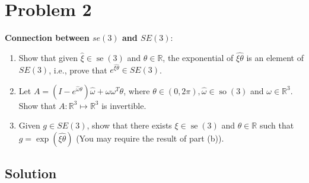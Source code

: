 \section*{Problem 2}

\textbf{Connection between \( s e(3) \) and \( S E(3) \)}:
\begin{enumerate}[label= (\alph*)]
    \item Show that given \( \hat{\xi} \in \operatorname{se}(3) \) and \( \theta \in \mathbb{R} \), the exponential of \( \hat{\xi \theta} \) is an element of \( S E(3) \), i.e., prove that \( e^{\widehat{\xi \theta}} \in S E(3) \).
    \item Let \( A=\left(I-e^{\hat{\omega} \theta}\right) \hat{\omega}+\omega \omega^{T} \theta \), where \( \theta \in(0,2 \pi), \hat{\omega} \in \operatorname{so}(3) \) and \( \omega \in \mathbb{R}^{3} \).
          Show that \( A: \mathbb{R}^{3} \mapsto \mathbb{R}^{3} \) is invertible.
    \item Given \( g \in S E(3) \), show that there exists \( \xi \in \operatorname{se}(3) \) and \( \theta \in \mathbb{R} \) such that \( g=\exp (\widehat{\xi \theta}) \)
          (You may require the result of part (b)).
\end{enumerate}

\subsection*{Solution}
